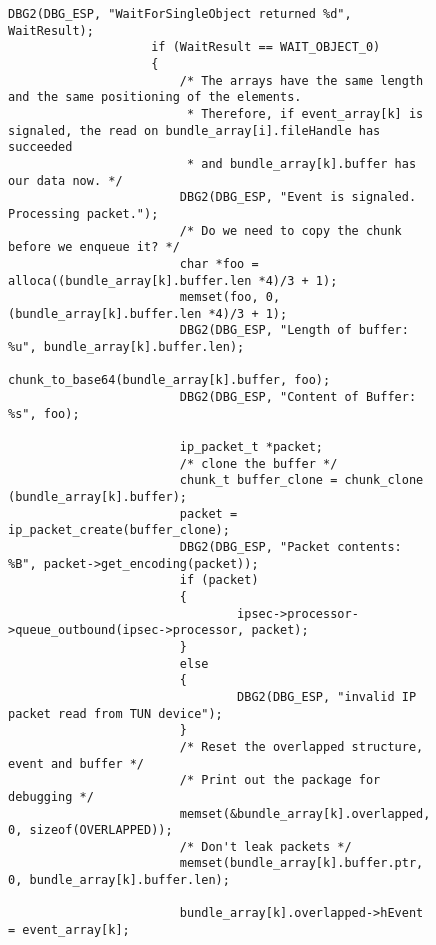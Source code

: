 \begin{figure}
\begin{lstlisting}[caption=Code für handle\_plain auf Windows]
                    DBG2(DBG_ESP, "WaitForSingleObject returned %d", WaitResult);
                    if (WaitResult == WAIT_OBJECT_0)
                    {
                        /* The arrays have the same length and the same positioning of the elements.
                         * Therefore, if event_array[k] is signaled, the read on bundle_array[i].fileHandle has succeeded
                         * and bundle_array[k].buffer has our data now. */
                        DBG2(DBG_ESP, "Event is signaled. Processing packet.");
                        /* Do we need to copy the chunk before we enqueue it? */
                        char *foo = alloca((bundle_array[k].buffer.len *4)/3 + 1);
                        memset(foo, 0, (bundle_array[k].buffer.len *4)/3 + 1);
                        DBG2(DBG_ESP, "Length of buffer: %u", bundle_array[k].buffer.len);
                        chunk_to_base64(bundle_array[k].buffer, foo);
                        DBG2(DBG_ESP, "Content of Buffer: %s", foo);

                        ip_packet_t *packet;
                        /* clone the buffer */
                        chunk_t buffer_clone = chunk_clone (bundle_array[k].buffer);
                        packet = ip_packet_create(buffer_clone);
                        DBG2(DBG_ESP, "Packet contents: %B", packet->get_encoding(packet));
                        if (packet)
                        {
                                ipsec->processor->queue_outbound(ipsec->processor, packet);
                        }
                        else
                        {
                                DBG2(DBG_ESP, "invalid IP packet read from TUN device");
                        }
                        /* Reset the overlapped structure, event and buffer */
                        /* Print out the package for debugging */
                        memset(&bundle_array[k].overlapped, 0, sizeof(OVERLAPPED));
                        /* Don't leak packets */
                        memset(bundle_array[k].buffer.ptr, 0, bundle_array[k].buffer.len);

                        bundle_array[k].overlapped->hEvent = event_array[k];


\end{lstlisting}
\end{figure}

